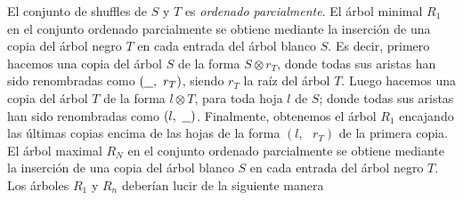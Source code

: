\documentclass[../main.tex]{subfiles}
\begin{document}
El conjunto de shuffles de $S$ y $T$ es \emph{ordenado parcialmente}. El \'arbol minimal $R_1$ en el conjunto ordenado parcialmente se obtiene mediante la inserci\'on de una copia del \'arbol negro $T$ en cada entrada del \'arbol blanco $S$.
Es decir, primero hacemos una copia del \'arbol $S$ de la forma $S\otimes r_T$, donde todas sus aristas han sido renombradas como $(\underline{\hspace{.25cm}},\text{ }r_T)$, siendo $r_T$ la ra\'iz del \'arbol $T$.
Luego hacemos una copia del \'arbol $T$ de la forma $l\otimes T$, para toda hoja $l$ de $S$; donde todas sus aristas han sido renombradas como $(l,\text{ }\underline{\hspace{.25cm}})$.
Finalmente, obtenemos el \'arbol $R_1$ encajando las \'ultimas copias encima de las hojas de la forma $(l,\text{ }r_T)$ de la primera copia.
El \'arbol maximal $R_N$ en el conjunto ordenado parcialmente se obtiene mediante la inserci\'on de una copia del \'arbol blanco $S$ en cada entrada del \'arbol negro $T$.
Los \'arboles $R_1$ y $R_n$ deber\'ian lucir de la siguiente manera
\end{document}

